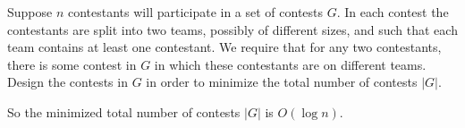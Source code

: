 \problem{}
Suppose $n$ contestants will participate in a set of contests $G$.  In each contest the contestants are split into two teams, possibly of different sizes, and such that each team contains at least one contestant.  We require that for any two contestants, there is some contest in $G$ in which these contestants are on different teams.  Design the contests in $G$ in order to minimize the total number of contests $|G|$.

\solution{}











So the minimized total number of contests $|G|$ is $O(\log n)$.\\

\newpage